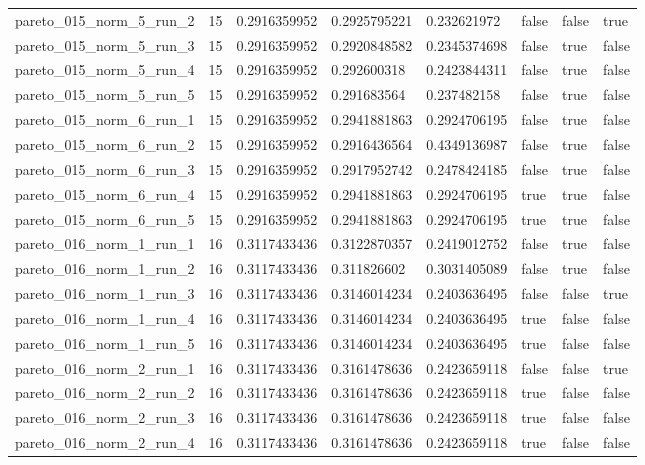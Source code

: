 \begin{tabular}{@{}llllllll@{}}
pareto\_015\_norm\_5\_run\_2 & 15 & 0.2916359952 & 0.2925795221 & 0.232621972 & false & false & true \\
pareto\_015\_norm\_5\_run\_3 & 15 & 0.2916359952 & 0.2920848582 & 0.2345374698 & false & true & false \\
pareto\_015\_norm\_5\_run\_4 & 15 & 0.2916359952 & 0.292600318 & 0.2423844311 & false & true & false \\
pareto\_015\_norm\_5\_run\_5 & 15 & 0.2916359952 & 0.291683564 & 0.237482158 & false & true & false \\
pareto\_015\_norm\_6\_run\_1 & 15 & 0.2916359952 & 0.2941881863 & 0.2924706195 & false & true & false \\
pareto\_015\_norm\_6\_run\_2 & 15 & 0.2916359952 & 0.2916436564 & 0.4349136987 & false & true & false \\
pareto\_015\_norm\_6\_run\_3 & 15 & 0.2916359952 & 0.2917952742 & 0.2478424185 & false & true & false \\
pareto\_015\_norm\_6\_run\_4 & 15 & 0.2916359952 & 0.2941881863 & 0.2924706195 & true & true & false \\
pareto\_015\_norm\_6\_run\_5 & 15 & 0.2916359952 & 0.2941881863 & 0.2924706195 & true & true & false \\
pareto\_016\_norm\_1\_run\_1 & 16 & 0.3117433436 & 0.3122870357 & 0.2419012752 & false & true & false \\
pareto\_016\_norm\_1\_run\_2 & 16 & 0.3117433436 & 0.311826602 & 0.3031405089 & false & true & false \\
pareto\_016\_norm\_1\_run\_3 & 16 & 0.3117433436 & 0.3146014234 & 0.2403636495 & false & false & true \\
pareto\_016\_norm\_1\_run\_4 & 16 & 0.3117433436 & 0.3146014234 & 0.2403636495 & true & false & false \\
pareto\_016\_norm\_1\_run\_5 & 16 & 0.3117433436 & 0.3146014234 & 0.2403636495 & true & false & false \\
pareto\_016\_norm\_2\_run\_1 & 16 & 0.3117433436 & 0.3161478636 & 0.2423659118 & false & false & true \\
pareto\_016\_norm\_2\_run\_2 & 16 & 0.3117433436 & 0.3161478636 & 0.2423659118 & true & false & false \\
pareto\_016\_norm\_2\_run\_3 & 16 & 0.3117433436 & 0.3161478636 & 0.2423659118 & true & false & false \\
pareto\_016\_norm\_2\_run\_4 & 16 & 0.3117433436 & 0.3161478636 & 0.2423659118 & true & false & false \\

\end{tabular}
